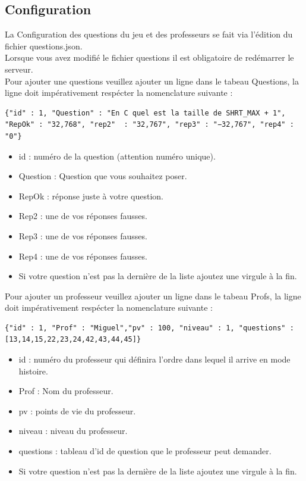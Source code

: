 \documentclass[a4paper,10pt]{report}
\begin{document}
\subsection{Configuration}
La Configuration des questions du jeu et des professeurs se fait via l'édition du fichier questions.json.\\
Lorsque vous avez modifié le fichier questions il est obligatoire de redémarrer le serveur.\\
Pour ajouter une questions veuillez ajouter un ligne dans le tabeau Questions, la ligne doit impérativement respécter
la nomenclature suivante :

\begin{lstlisting}
{"id" : 1, "Question" : "En C quel est la taille de SHRT_MAX + 1", "RepOk" : "32,768", "rep2"  : "32,767", "rep3" : "−32,767", "rep4" : "0"}
\end{lstlisting}

\begin{itemize}
 \item id : numéro de la question (attention numéro unique).
 \item Question : Question que vous souhaitez poser.
 \item RepOk : réponse juste à votre question.
 \item Rep2 : une de vos réponses fausses.
 \item Rep3 : une de vos réponses fausses.
 \item Rep4 : une de vos réponses fausses.
 \item Si votre question n'est pas la dernière de la liste ajoutez une virgule à la fin.
\end{itemize}

Pour ajouter un professeur veuillez ajouter un ligne dans le tabeau Profs, la ligne doit impérativement respécter
la nomenclature suivante :

\begin{lstlisting}
{"id" : 1, "Prof" : "Miguel","pv" : 100, "niveau" : 1, "questions" : [13,14,15,22,23,24,42,43,44,45]}
\end{lstlisting}

\begin{itemize}
 \item id : numéro du professeur qui définira l'ordre dans lequel il arrive en mode histoire.
 \item Prof : Nom du professeur.
 \item pv : points de vie du professeur.
 \item niveau : niveau du professeur.
 \item questions : tableau d'id de question que le professeur peut demander.
 \item Si votre question n'est pas la dernière de la liste ajoutez une virgule à la fin.
\end{itemize}
\end{document}
